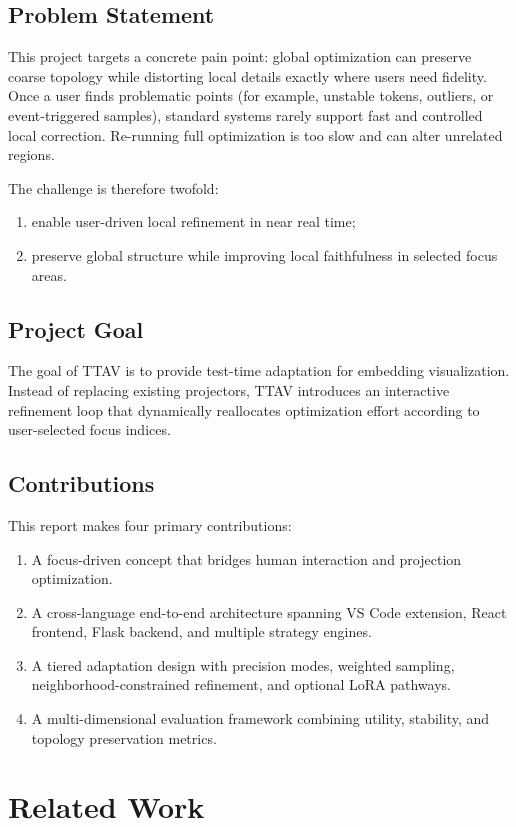 \documentclass[12pt,a4paper]{report}
\newcommand{\systemname}{TTAV}
\begin{document}
\section{Problem Statement}
This project targets a concrete pain point: global optimization can preserve coarse topology while distorting local details exactly where users need fidelity. Once a user finds problematic points (for example, unstable tokens, outliers, or event-triggered samples), standard systems rarely support fast and controlled local correction. Re-running full optimization is too slow and can alter unrelated regions.

The challenge is therefore twofold:
\begin{enumerate}
\item enable user-driven local refinement in near real time;
\item preserve global structure while improving local faithfulness in selected focus areas.
\end{enumerate}

\section{Project Goal}
The goal of \systemname{} is to provide test-time adaptation for embedding visualization. Instead of replacing existing projectors, \systemname{} introduces an interactive refinement loop that dynamically reallocates optimization effort according to user-selected focus indices.

\section{Contributions}
This report makes four primary contributions:
\begin{enumerate}
\item A focus-driven concept that bridges human interaction and projection optimization.
\item A cross-language end-to-end architecture spanning VS Code extension, React frontend, Flask backend, and multiple strategy engines.
\item A tiered adaptation design with precision modes, weighted sampling, neighborhood-constrained refinement, and optional LoRA pathways.
\item A multi-dimensional evaluation framework combining utility, stability, and topology preservation metrics.
\end{enumerate}

\chapter{Related Work}
\end{document}

